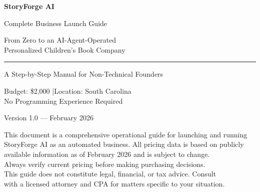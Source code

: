 \documentclass[12pt, letterpaper, oneside]{book}
\begin{document}
\begin{titlepage}
\begin{center}
\vspace*{1.5in}

{\fontsize{42}{50}\selectfont\bfseries\textcolor{primary}{StoryForge AI}}

\vspace{0.3in}
{\fontsize{18}{22}\selectfont\textcolor{darkbg}{Complete Business Launch Guide}}

\vspace{0.5in}
{\large\textcolor{midgray}{From Zero to an AI-Agent-Operated\\
Personalized Children's Book Company}}

\vspace{0.4in}
\rule{3in}{0.5pt}

\vspace{0.4in}
{\large\textcolor{darkbg}{A Step-by-Step Manual for Non-Technical Founders}}

\vspace{0.3in}
{\normalsize\textcolor{midgray}{Budget: \$2{,}000 \quad|\quad Location: South Carolina\\[6pt]
No Programming Experience Required}}

\vfill
{\small\textcolor{midgray}{Version 1.0 --- February 2026}}
\end{center}
\end{titlepage}

\thispagestyle{empty}
\vspace*{\fill}
\noindent\textcolor{midgray}{\small
This document is a comprehensive operational guide for launching and running\\
StoryForge AI as an automated business. All pricing data is based on publicly\\
available information as of February 2026 and is subject to change.\\[12pt]
Always verify current pricing before making purchasing decisions.\\[12pt]
This guide does not constitute legal, financial, or tax advice. Consult\\
with a licensed attorney and CPA for matters specific to your situation.}
\newpage
\end{document}
